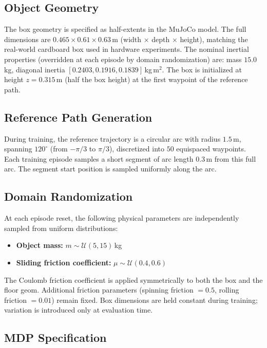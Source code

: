 \subsection{Object Geometry}

The box geometry is specified as half-extents in the MuJoCo model.
The full dimensions are $0.465 \times 0.61 \times 0.63$\,m (width $\times$ depth $\times$ height), matching the real-world cardboard box used in hardware experiments.
The nominal inertial properties (overridden at each episode by domain randomization) are: mass $15.0$\,kg, diagonal inertia $[0.2403, 0.1916, 0.1839]$\,kg\,m$^2$.
The box is initialized at height $z = 0.315$\,m (half the box height) at the first waypoint of the reference path.

\subsection{Reference Path Generation}

During training, the reference trajectory is a circular arc with radius $1.5$\,m, spanning $120^\circ$ (from $-\pi/3$ to $\pi/3$), discretized into $50$ equispaced waypoints.
Each training episode samples a short segment of arc length $0.3$\,m from this full arc.
The segment start position is sampled uniformly along the arc.

\subsection{Domain Randomization}

At each episode reset, the following physical parameters are independently sampled from uniform distributions:

\begin{itemize}
    \item \textbf{Object mass:} $m \sim \mathcal{U}(5, 15)$\,kg
    \item \textbf{Sliding friction coefficient:} $\mu \sim \mathcal{U}(0.4, 0.6)$
\end{itemize}

\noindent
The Coulomb friction coefficient is applied symmetrically to both the box and the floor geom.
Additional friction parameters (spinning friction $= 0.5$, rolling friction $= 0.01$) remain fixed.
Box dimensions are held constant during training; variation is introduced only at evaluation time.

\subsection{MDP Specification}
\label{app:mdp}

